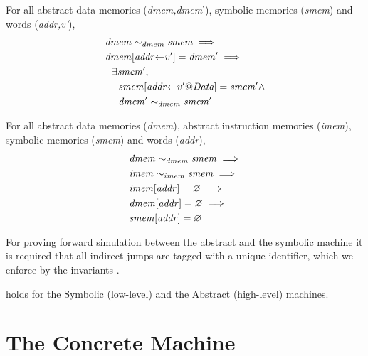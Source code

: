 \begin{lemma}
\label{refine_memory_upd_fwd}
For all abstract data memories (\textit{dmem,dmem}'),
symbolic memories (\textit{smem}) and
words (\textit{addr,v'}),
\begin{align*}
  & \mathit{dmem} \sim_{dmem} \mathit{smem} \implies \\
  & \mathit{dmem}[\mathit{addr}{\leftarrow}v'] = \mathit{dmem'} \implies \\
  & ~~ \exists \mathit{smem'}, \\
  & ~~~~ \mathit{smem}[\mathit{addr}{\leftarrow}v'@\textit{Data}] = \mathit{smem'} \land \\
  & ~~~~  \mathit{dmem'} \sim_{dmem} \mathit{smem'}
\end{align*}
\end{lemma}

\begin{lemma}
\label{refine_memory_none}
For all abstract data memories (\textit{dmem}),
abstract instruction memories (\textit{imem}),
symbolic memories (\textit{smem}) and words (\textit{addr}),
\begin{align*}
  & \mathit{dmem} \sim_{dmem} \mathit{smem} \implies \\
  & \mathit{imem} \sim_{imem} \mathit{smem} \implies \\
  & \mathit{imem}[\mathit{addr}] = \varnothing\implies \\
  & \mathit{dmem}[\mathit{addr}] = \varnothing\implies \\
  & \mathit{smem}[\mathit{addr}] = \varnothing
\end{align*}
\end{lemma}

For proving forward simulation between the abstract and the symbolic
machine it is required that all indirect jumps are tagged with a
unique identifier, which we enforce by the invariants
.

\begin{theorem}
\label{fwd_simulation_SA}
 holds for the Symbolic (low-level) and
the Abstract (high-level) machines.
\end{theorem}

\section{The Concrete  Machine}\label{sec:concrete_cfi}

